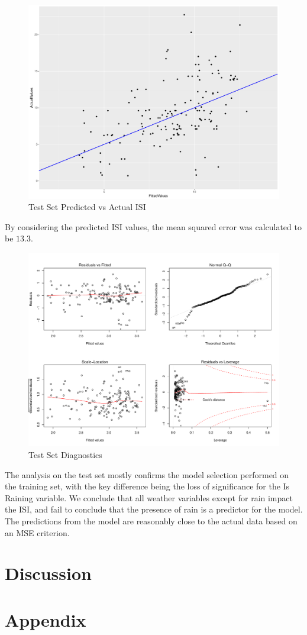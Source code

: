 \documentclass{article}
\begin{document}
\begin{figure}
\centering
\includegraphics[width=\textwidth]{TestSetFittedVsActual.pdf}
\caption{Test Set Predicted vs Actual ISI}
\label{TestSetPredictedVsActual}
\end{figure}
By considering the predicted ISI values, the mean squared error was calculated to be $13.3$. 
\begin{figure}
\centering
\includegraphics[width = \textwidth]{TestSetDiagnostics.pdf}
\caption{Test Set Diagnostics}
\label{FinalModelDiagnostics}
\end{figure}


The analysis on the test set mostly confirms the model selection performed on the training set, with the key difference being the loss of significance for the Is Raining variable.  We conclude that all weather variables except for rain impact the ISI, and fail to conclude that the presence of rain is a predictor for the model. The predictions from the model are reasonably close to the actual data based on an MSE criterion. 




\section{Discussion}\label{Discussion}

\section{Appendix}
\end{document}
